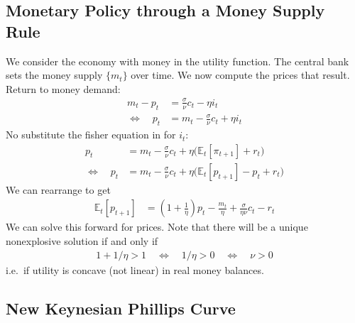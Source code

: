 \documentclass[12pt]{article}
\theoremstyle{plain}
\theoremstyle{definition}
\theoremstyle{remark}
\newcommand{\E}{\mathbb{E}}
\begin{document}
\subsection{Monetary Policy through a Money Supply Rule}

We consider the economy with money in the utility function. The central
bank sets the money supply $\{m_t\}$ over time. We now compute the
prices that result. Return to money demand:
\begin{align*}
  m_t - p_t
  &=
  \frac{\sigma}{\nu}c_t
  - \eta i_t \\
  \iff\quad
  p_t
  &=
  m_t
  - \frac{\sigma}{\nu}c_t
  + \eta i_t
\end{align*}
No substitute the fisher equation in for $i_t$:
\begin{align*}
  p_t &=
  m_t
  - \frac{\sigma}{\nu}c_t
  + \eta \big(\E_t[\pi_{t+1}] + r_t\big)
  \\
  \iff\quad
  p_t
  &=
  m_t
  - \frac{\sigma}{\nu}c_t
  + \eta \big(\E_t[p_{t+1}] - p_t + r_t\big)
\end{align*}
We can rearrange to get
\begin{align*}
  \E_t[p_{t+1}]
  &=
  \left(
  1+
  \frac{1}{\eta}
  \right)p_t
  -
  \frac{m_t}{\eta}
  + \frac{\sigma}{\eta\nu}c_t
  - r_t
\end{align*}
We can solve this forward for prices. Note that there will be a unique
nonexplosive solution if and only if
\begin{align*}
  1+1/\eta>1
  \quad\iff\quad
  1/\eta>0
  \quad\iff\quad
  \nu > 0
\end{align*}
i.e.\ if utility is concave (not linear) in real money balances.

\clearpage
\subsection{New Keynesian Phillips Curve}
\end{document}
